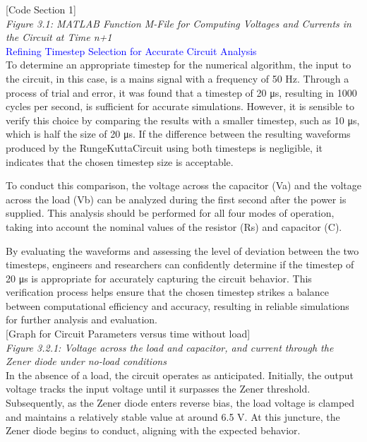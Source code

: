 [Code Section 1]\\

\emph{Figure 3.1: MATLAB Function M-File for Computing Voltages and Currents in the Circuit at Time n+1}\\

\textcolor{blue}{Refining Timestep Selection for Accurate Circuit Analysis}\\


To determine an appropriate timestep for the numerical algorithm, the input to the circuit, in this case, is a mains signal with a frequency of 50 Hz. Through a process of trial and error, it was found that a timestep of 20 μs, resulting in 1000 cycles per second, is sufficient for accurate simulations. However, it is sensible to verify this choice by comparing the results with a smaller timestep, such as 10 μs, which is half the size of 20 μs. If the difference between the resulting waveforms produced by the RungeKuttaCircuit using both timesteps is negligible, it indicates that the chosen timestep size is acceptable.

To conduct this comparison, the voltage across the capacitor (Va) and the voltage across the load (Vb) can be analyzed during the first second after the power is supplied. This analysis should be performed for all four modes of operation, taking into account the nominal values of the resistor (Rs) and capacitor (C).

By evaluating the waveforms and assessing the level of deviation between the two timesteps, engineers and researchers can confidently determine if the timestep of 20 μs is appropriate for accurately capturing the circuit behavior. This verification process helps ensure that the chosen timestep strikes a balance between computational efficiency and accuracy, resulting in reliable simulations for further analysis and evaluation.\\

[Graph for Circuit Parameters versus time without load]\\

\emph{Figure 3.2.1: Voltage across the load and capacitor, and current through the Zener diode under no-load conditions}\\

In the absence of a load, the circuit operates as anticipated. Initially, the output voltage tracks the input voltage until it surpasses the Zener threshold. Subsequently, as the Zener diode enters reverse bias, the load voltage is clamped and maintains a relatively stable value at around 6.5 V. At this juncture, the Zener diode begins to conduct, aligning with the expected behavior.\\

